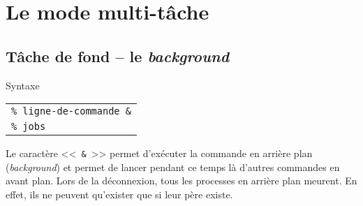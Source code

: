 %
%

\setcounter{remarque-cnt}{1}
\setcounter{example-cnt}{1}
\chapter{\label{multitask}Le mode multi-t{\^a}che}
\thispagestyle{fancy}

\section{T{\^a}che de fond -- le {\sl background}}

\begin{definition}{Syntaxe}
\begin{tabular}{@{\hspace{1cm}}l}
	{\tt \% ligne-de-commande \&}\\[0.2cm]
	{\tt \% jobs}\\[0.2cm]
\end{tabular}
\end{definition}

Le caract{\`e}re <<~\verb=&=~>> permet
d'ex{\'e}cuter la commande en arri{\`e}re plan (\textsl{background}) et
permet de lancer pendant ce temps l{\`a} d'autres commandes en avant
plan. Lors de la d{\'e}connexion, tous les processes en arri{\`e}re plan
meurent. En effet, ils ne peuvent qu'exister que si leur p{\`e}re
existe.

